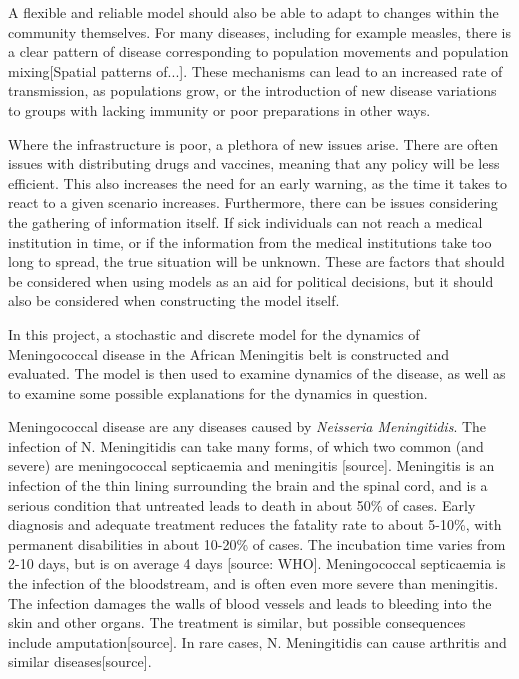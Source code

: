 \documentclass[10pt,a4paper]{article}
\begin{document}
A flexible and reliable model should also be able to adapt to changes within the community themselves. For many diseases, including for example measles, there is a clear pattern of disease corresponding to population movements and population mixing[Spatial patterns of...]. These mechanisms can lead to an increased rate of transmission, as populations grow, or the introduction of new disease variations to groups with lacking immunity or poor preparations in other ways.

Where the infrastructure is poor, a plethora of new issues arise. There are often issues with distributing drugs and vaccines, meaning that any policy will be less efficient. This also increases the need for an early warning, as the time it takes to react to a given scenario increases. Furthermore, there can be issues considering the gathering of information itself. If sick individuals can not reach a medical institution in time, or if the information from the medical institutions take too long to spread, the true situation will be unknown. These are factors that should be considered when using models as an aid for political decisions, but it should also be considered when constructing the model itself.

In this project, a stochastic and discrete model for the dynamics of Meningococcal disease in the African Meningitis belt is constructed and evaluated. The model is then used to examine dynamics of the disease, as well as to examine some possible explanations for the dynamics in question.

Meningococcal disease are any diseases caused by \emph{Neisseria Meningitidis}. The infection of N. Meningitidis can take many forms, of which two common (and severe) are meningococcal septicaemia and meningitis [source]. Meningitis is an infection of the thin lining surrounding the brain and the spinal cord, and is a serious condition that untreated leads to death in about 50\% of cases. Early diagnosis and adequate treatment reduces the fatality rate to about 5-10\%, with permanent disabilities in about 10-20\% of cases. The incubation time varies from 2-10 days, but is on average 4 days [source: WHO]. Meningococcal septicaemia is the infection of the bloodstream, and is often even more severe than meningitis. The infection damages the walls of blood vessels and leads to bleeding into the skin and other organs. The treatment is similar, but possible consequences include amputation[source]. In rare cases, N. Meningitidis can cause arthritis and similar diseases[source].
\end{document}
